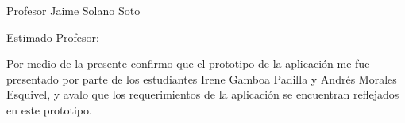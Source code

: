 \documentclass[12pt]{letter}
\date{Marzo, 1 2013}
\begin{document}
 
\begin{letter}{Profesor Jaime Solano Soto}
\opening{Estimado Profesor:}
 
Por medio de la presente confirmo que el prototipo de la aplicaci\'on me fue presentado por parte de los estudiantes Irene Gamboa Padilla y Andr\'es Morales Esquivel, y avalo que los requerimientos de la aplicaci\'on se encuentran reflejados en este prototipo.
 
\closing{\ }
 
\end{letter}
 
\end{document}
